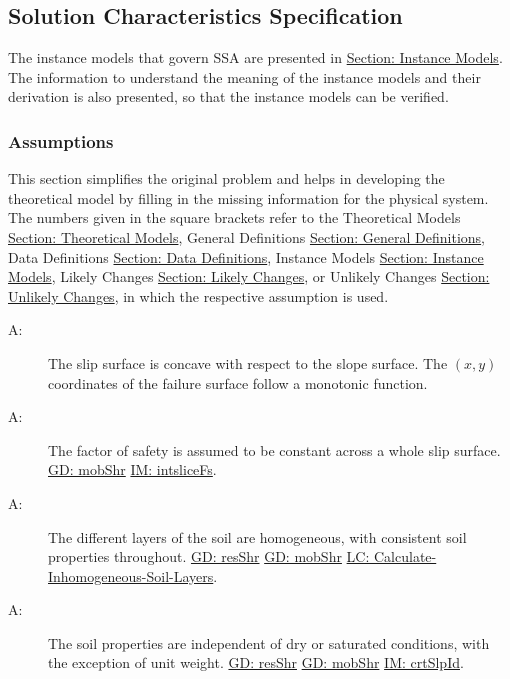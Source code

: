 \documentclass[12pt]{article}
\newcounter{assumpnum}
\newcommand{\atheassumpnum}{A\theassumpnum}
\begin{document}
\subsection{Solution Characteristics Specification}
\label{Sec:SolCharSpec}
The instance models that govern SSA are presented in \hyperref[Sec:IMs]{Section: Instance Models}. The information to understand the meaning of the instance models and their derivation is also presented, so that the instance models can be verified.
\subsubsection{Assumptions}
\label{Sec:Assumps}
This section simplifies the original problem and helps in developing the theoretical model by filling in the missing information for the physical system. The numbers given in the square brackets refer to the Theoretical Models \hyperref[Sec:TMs]{Section: Theoretical Models}, General Definitions \hyperref[Sec:GDs]{Section: General Definitions}, Data Definitions \hyperref[Sec:DDs]{Section: Data Definitions}, Instance Models \hyperref[Sec:IMs]{Section: Instance Models}, Likely Changes \hyperref[Sec:LCs]{Section: Likely Changes}, or Unlikely Changes \hyperref[Sec:UCs]{Section: Unlikely Changes}, in which the respective assumption is used.
\begin{description}
\item[\atheassumpnum\label{A:Slip-Surface-Concave}:]The slip surface is concave with respect to the slope surface. The $(x,y)$ coordinates of the failure surface follow a monotonic function.
\end{description}
\begin{description}
\item[\atheassumpnum\label{A:Factor-of-Safety}:]The factor of safety is assumed to be constant across a whole slip surface. \hyperref[GD:mobShr]{GD: mobShr} \hyperref[IM:intsliceFs]{IM: intsliceFs}.
\end{description}
\begin{description}
\item[\atheassumpnum\label{A:Soil-Layer-Homogeneous}:]The different layers of the soil are homogeneous, with consistent soil properties throughout. \hyperref[GD:resShr]{GD: resShr} \hyperref[GD:mobShr]{GD: mobShr} \hyperref[LC_inhomogeneous]{LC: Calculate-Inhomogeneous-Soil-Layers}.
\end{description}
\begin{description}
\item[\atheassumpnum\label{A:Soil-Properties}:]The soil properties are independent of dry or saturated conditions, with the exception of unit weight. \hyperref[GD:resShr]{GD: resShr} \hyperref[GD:mobShr]{GD: mobShr} \hyperref[IM:crtSlpId]{IM: crtSlpId}.
\end{description}
\end{document}
